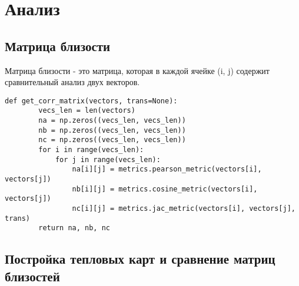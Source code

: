 \section{Анализ}

\subsection{Матрица близости}

Матрица близости - это матрица, которая в каждой ячейке (i, j) содержит сравнительный анализ двух векторов.

\begin{lstlisting}[label=cor_matr, caption={Получение матрицы близости}]
    def get_corr_matrix(vectors, trans=None):
        vecs_len = len(vectors)
        na = np.zeros((vecs_len, vecs_len))
        nb = np.zeros((vecs_len, vecs_len))
        nc = np.zeros((vecs_len, vecs_len))
        for i in range(vecs_len):
            for j in range(vecs_len):
                na[i][j] = metrics.pearson_metric(vectors[i], vectors[j])
                nb[i][j] = metrics.cosine_metric(vectors[i], vectors[j])
                nc[i][j] = metrics.jac_metric(vectors[i], vectors[j], trans)
        return na, nb, nc
\end{lstlisting}

\subsection{Постройка тепловых карт и сравнение матриц близостей}


